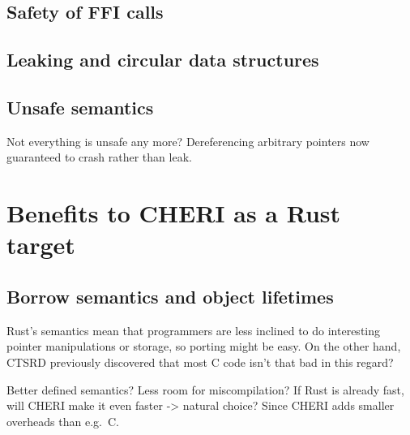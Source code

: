 \documentclass[dissertation.tex]{subfiles}
\begin{document}


\subsection{Safety of FFI calls}


\subsection{Leaking and circular data structures}


\subsection{Unsafe semantics}
Not everything is unsafe any more? Dereferencing arbitrary pointers now
guaranteed to crash rather than leak.


\section{Benefits to CHERI as a Rust target}
\label{sec:eval-cheri}



\subsection{Borrow semantics and object lifetimes}
Rust's semantics mean that programmers are less inclined to do
interesting pointer manipulations or storage, so porting might be easy.
On the other hand, CTSRD previously discovered that most C code isn't
that bad in this regard?

Better defined semantics? Less room for miscompilation?
If Rust is already fast, will CHERI make it even faster -> natural
choice? Since CHERI adds smaller overheads than e.g.~C.
\end{document}
